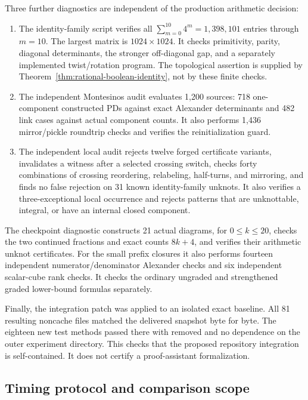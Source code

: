 Three further diagnostics are independent of the production arithmetic
decision:
\begin{enumerate}
\item The identity-family script verifies all
\(\sum_{m=0}^{10}4^m=1{,}398{,}101\) entries through \(m=10\).
The largest matrix is \(1024\times1024\). It checks primitivity, parity,
diagonal determinants, the stronger off-diagonal gap, and a separately
implemented twist/rotation program. The topological assertion is supplied
by Theorem~\ref{thm:rational-boolean-identity}, not by these finite checks.
\item The independent Montesinos audit evaluates 1,200 sources: 718
one-component constructed PDs against exact Alexander determinants and
482 link cases against actual component counts. It also performs 1,436
mirror/pickle roundtrip checks and verifies the reinitialization guard.
\item The independent local audit rejects twelve forged certificate
variants, invalidates a witness after a selected crossing switch,
checks forty combinations of crossing reordering, relabeling,
half-turns, and mirroring, and finds no false rejection on 31 known
identity-family unknots. It also verifies a three-exceptional local
occurrence and rejects patterns that are unknottable, integral, or have
an internal closed component.
\end{enumerate}

The checkpoint diagnostic constructs 21 actual diagrams, for \(0\le k\le20\),
checks the two continued fractions and exact counts \(8k+4\), and verifies
their arithmetic unknot certificates. For the small prefix closures it
also performs fourteen independent numerator/denominator Alexander checks
and six independent scalar-cube rank checks. It checks the ordinary
ungraded and strengthened graded lower-bound formulas separately.

Finally, the integration patch was applied to an isolated exact baseline.
All 81 resulting noncache files matched the delivered 
snapshot byte for byte. The eighteen new test methods passed there with
 removed and no dependence on the outer experiment
directory. This checks that the proposed repository integration is
self-contained. It does not certify a proof-assistant formalization.

\subsection{Timing protocol and comparison scope}

